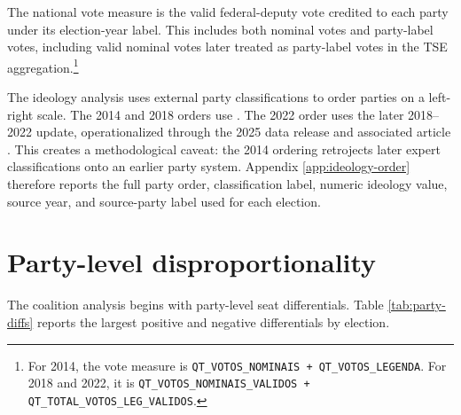 \documentclass[11pt]{article}
\begin{document}
The national vote measure is the valid federal-deputy vote credited to each
party under its election-year label. This includes both nominal votes and
party-label votes, including valid nominal votes later treated as party-label
votes in the TSE aggregation.\footnote{For 2014, the vote measure is
\texttt{QT\_VOTOS\_NOMINAIS + QT\_VOTOS\_LEGENDA}. For 2018 and 2022, it is
\texttt{QT\_VOTOS\_NOMINAIS\_VALIDOS + QT\_TOTAL\_VOTOS\_LEG\_VALIDOS}.}

The ideology analysis uses external party classifications to order parties on a
left-right scale. The 2014 and 2018 orders use \textcite{bolognesi2023nova}. The 2022 order
uses the later 2018--2022 update, operationalized through the 2025 data release
and associated article \parencite{bolognesi2025dataverse,bolognesi2026desaparecimento}.
This creates a methodological caveat: the 2014 ordering retrojects later expert
classifications onto an earlier party system. Appendix \ref{app:ideology-order}
therefore reports the full party order, classification label, numeric ideology
value, source year, and source-party label used for each election.

\section{Party-level disproportionality}
\label{sec:party}

The coalition analysis begins with party-level seat differentials. Table
\ref{tab:party-diffs} reports the largest positive and negative differentials by
election.  
\end{document}
